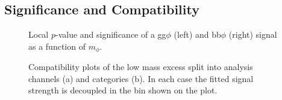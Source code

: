 \subsection{Significance and Compatibility}

\begin{figure}[!hbtp]
\centering
\caption{Local $p$-value and significance of a gg$\phi$ (left) and bb$\phi$ (right) signal as a function of $m_{\phi}$.}
\label{fig:significance}
\end{figure}

\begin{figure}[!hbtp]
\centering
\caption{Compatibility plots of the low mass excess split into analysis channels (a) and categories (b). In each case the fitted signal strength is decoupled in the bin shown on the plot.}
\label{fig:low_mass_compatibility}
\end{figure}

